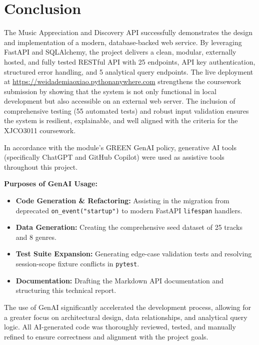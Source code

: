 \documentclass[11pt,a4paper]{article}
\begin{document}
\section{Conclusion}

The Music Appreciation and Discovery API successfully demonstrates the design and implementation of a modern, database-backed web service. By leveraging FastAPI and SQLAlchemy, the project delivers a clean, modular, externally hosted, and fully tested RESTful API with 25 endpoints, API key authentication, structured error handling, and 5 analytical query endpoints. The live deployment at \url{https://weidademiaoxiao.pythonanywhere.com} strengthens the coursework submission by showing that the system is not only functional in local development but also accessible on an external web server. The inclusion of comprehensive testing (55 automated tests) and robust input validation ensures the system is resilient, explainable, and well aligned with the criteria for the XJCO3011 coursework.

\vspace{1em}

\begin{genaibox}
In accordance with the module's GREEN GenAI policy, generative AI tools (specifically ChatGPT and GitHub Copilot) were used as assistive tools throughout this project. 

\textbf{Purposes of GenAI Usage:}
\begin{itemize}[label=\textcolor{primary}{\textbullet}, noitemsep]
    \item \textbf{Code Generation \& Refactoring:} Assisting in the migration from deprecated \texttt{on\_event("startup")} to modern FastAPI \texttt{lifespan} handlers.
    \item \textbf{Data Generation:} Creating the comprehensive seed dataset of 25 tracks and 8 genres.
    \item \textbf{Test Suite Expansion:} Generating edge-case validation tests and resolving session-scope fixture conflicts in \texttt{pytest}.
    \item \textbf{Documentation:} Drafting the Markdown API documentation and structuring this technical report.
\end{itemize}

The use of GenAI significantly accelerated the development process, allowing for a greater focus on architectural design, data relationships, and analytical query logic. All AI-generated code was thoroughly reviewed, tested, and manually refined to ensure correctness and alignment with the project goals.
\end{genaibox}
\end{document}

